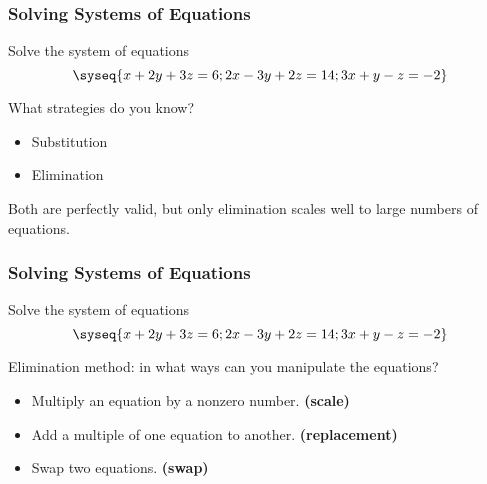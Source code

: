 
\begin{frame}
\frametitle{Solving Systems of Equations}

\vskip-3mm
\begin{eg}
  Solve the system of equations
  \[\syseq{x + 2y + 3z = 6;
    2x - 3y + 2z = 14;
    3x + y - z = -2
  }\]
\end{eg}

\pause
What strategies do you know?

\begin{webonly}
  \begin{itemize}
  \item Substitution
  \item Elimination
  \end{itemize}

  Both are perfectly valid, but only elimination scales well to large numbers of
  equations.
\end{webonly}

\end{frame}



\begin{frame}
\frametitle{Solving Systems of Equations}

\vskip-3mm
\begin{eg}
  Solve the system of equations
  \[\syseq{x + 2y + 3z = 6;
    2x - 3y + 2z = 14;
    3x + y - z = -2
  }\]
\end{eg}

\alert{Elimination method:} in what ways can you manipulate the equations?

\vfill

\begin{webonly}
  \begin{itemize}
  \item Multiply an equation by a nonzero number.
      \hfill{\bf\color{seq-blue}(scale)}
  \item Add a multiple of one equation to another.
      \hfill{\bf\color{seq-blue}(replacement)} 
  \item Swap two equations.
      \hfill{\bf\color{seq-blue}(swap)}
  \end{itemize}
\end{webonly}
\vfill

\end{frame}


